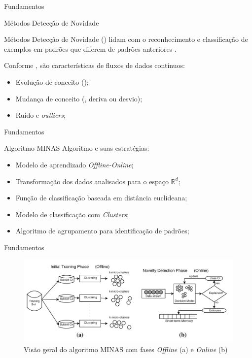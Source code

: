 \documentclass[aspectratio=43,10pt]{beamer}
\begin{document}
\begin{frame}[fragile]{Fundamentos}
\begin{alertblock}{Métodos Detecção de Novidade}
  
  \vspace{5mm}
  Métodos Detecção de Novidade (\novelty) lidam com o reconhecimento e
  classificação de exemplos em padrões que diferem de padrões anteriores
  \cite{PERNER2007,Gama2010}.

  Conforme , são características de fluxos de dados contínuos:
  \begin{itemize}
    \item Evolução de conceito (\evolution);
    \item Mudança de conceito (\drift, deriva ou desvio);
    \item Ruído e \emph{outliers};
  \end{itemize}
\end{alertblock}
\end{frame}
\begin{frame}[fragile]{Fundamentos}
\begin{alertblock}{Algoritmo MINAS}
  \vspace{5mm}
  Algoritmo e suas estratégias:
  \begin{itemize}
    \item Modelo de aprendizado \emph{Offline-Online};
    \item Transformação dos dados analisados para o espaço $\mathbb{R}^d$;
    \item Função de classificação baseada em distância euclideana;
    \item Modelo de classificação com \emph{Clusters};
    \item Algoritmo de agrupamento para identificação de padrões;
  \end{itemize}
\end{alertblock}
\end{frame}

\begin{frame}[fragile]{Fundamentos}
\begin{figure}[ht]
\centering
\includegraphics[width=\textwidth]{figuras/FariaMinas2015-fases.png}
\caption{Visão geral do algoritmo MINAS com fases \emph{Offline} (a) e 
\emph{Online} (b) \cite{Faria2016minas}}
\label{fig:minas}
\end{figure}
\end{frame}
\end{document}
